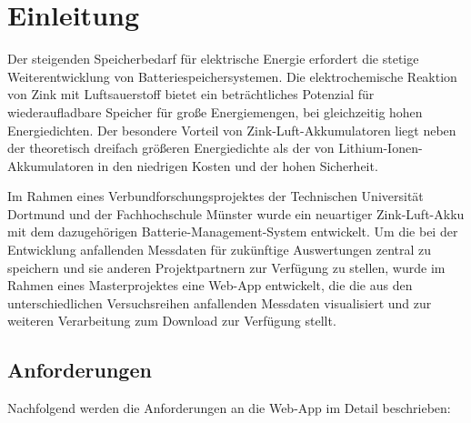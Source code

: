 \chapter{Einleitung}\label{ch:einleitung}


Der steigenden Speicherbedarf für elektrische Energie erfordert die stetige Weiterentwicklung von Batteriespeichersystemen. Die elektrochemische Reaktion von Zink mit Luftsauerstoff bietet ein beträchtliches Potenzial für wiederaufladbare Speicher für große Energiemengen, bei gleichzeitig hohen Energiedichten. Der besondere Vorteil von Zink-Luft-Akkumulatoren liegt neben der theoretisch dreifach größeren Energiedichte als der von Lithium-Ionen-Akkumulatoren in den niedrigen Kosten und der hohen Sicherheit.

Im Rahmen eines Verbundforschungsprojektes der Technischen Universität Dortmund und der Fachhochschule Münster wurde ein neuartiger Zink-Luft-Akku mit dem dazugehörigen Batterie-Management-System entwickelt. Um die bei der Entwicklung anfallenden Messdaten für zukünftige Auswertungen zentral zu speichern und sie anderen Projektpartnern zur Verfügung zu stellen, wurde im Rahmen eines Masterprojektes eine Web-App entwickelt, die die aus den unterschiedlichen Versuchsreihen anfallenden Messdaten visualisiert und zur weiteren Verarbeitung zum Download zur Verfügung stellt.

\section{Anforderungen}

Nachfolgend werden die Anforderungen an die Web-App im Detail beschrieben:

